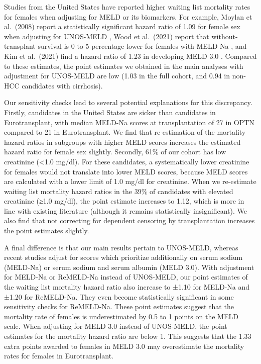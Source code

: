 \documentclass[11pt,twoside,]{book}
\begin{document}
Studies from the United States have reported higher waiting list
mortality rates for females when adjusting for MELD or its biomarkers. For example, Moylan
et al.~(2008) report a statistically significant hazard ratio of 1.09 for
female sex when adjusting for UNOS-MELD \citep{moylanDisparitiesLiverTransplantation2008},
Wood et al.~(2021) report that without-transplant survival is 0 to 5
percentage lower for females with MELD-Na \citep{woodCorrectingSexDisparity2021}, and
Kim et al.~(2021) find a hazard ratio of 1.23 in developing MELD 3.0 \citep{kimMELD3point0}.
Compared to these estimates, the point estimates we obtained in the main analyses
with adjustment for UNOS-MELD are low (1.03 in the full cohort, and 0.94 in non-HCC candidates with cirrhosis).

Our sensitivity checks lead to several potential explanations for this discrepancy.
Firstly, candidates in the United States are sicker than
candidates in Eurotransplant,
with median MELD-Na scores at transplantation of 27 in OPTN \citep{kwongOPTNSRTR20202022}
compared to 21 in Eurotransplant. We find that re-estimation of the mortality hazard
ratios in subgroups with higher MELD scores increases the estimated hazard ratio
for female sex slightly.
Secondly, 61\% of our cohort has low creatinine (\textless 1.0 mg/dl). For these
candidates, a systematically lower creatinine for females would not translate into
lower MELD scores, because MELD scores are calculated with a lower limit of 1.0
mg/dl for creatinine. When we re-estimate waiting list mortality hazard ratios
in the 39\% of candidates with elevated creatinine (≥1.0 mg/dl), the point
estimate increases to 1.12, which is more in line with existing literature
(although it remains statistically insignificant). We also find that not
correcting for dependent censoring by transplantation increases the point
estimates slightly.

A final difference is that our main results pertain to UNOS-MELD, whereas recent
studies adjust for scores which prioritize additionally on serum sodium (MELD-Na)
or serum sodium and serum albumin (MELD 3.0). With adjustment for
MELD-Na or ReMELD-Na instead of UNOS-MELD, our point estimates
of the waiting list mortality hazard ratio also increase to ±1.10 for MELD-Na
and ±1.20 for ReMELD-Na. They even become statistically significant in some
sensitivity checks for ReMELD-Na. These point estimates suggest
that the mortality rate of females is underestimated by 0.5 to 1 points on the MELD scale. When
adjusting for MELD 3.0 instead of UNOS-MELD, the point estimates for the mortality
hazard ratio are below 1. This suggests that the
1.33 extra points awarded to females in MELD 3.0 may overestimate the mortality
rates for females in Eurotransplant.
\end{document}
